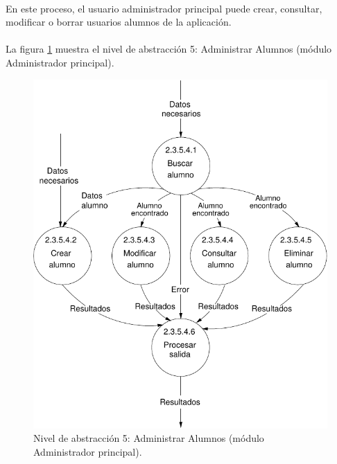 \paragraph{}En este proceso, el usuario administrador principal puede crear,
consultar, modificar o borrar usuarios alumnos de la aplicación.

\paragraph{}La figura \ref{diagramaNivel5-AdministrarAlumnos}
muestra el nivel de abstracción 5: Administrar Alumnos (módulo Administrador
principal).

  \begin{figure}[!ht]
    \begin{center}
      \includegraphics[]{08.Analisis_Funcional/8.2.DFDs/Niveles/Nivel5/AdministradorPrincipal/AdministrarUsuarios/AdministrarAlumnos/Diagramas/nivel5-AdministrarAlumnos.pdf}
      \caption{Nivel de abstracción 5: Administrar Alumnos (módulo
      Administrador principal).}
      \label{diagramaNivel5-AdministrarAlumnos}
    \end{center}
  \end{figure}
